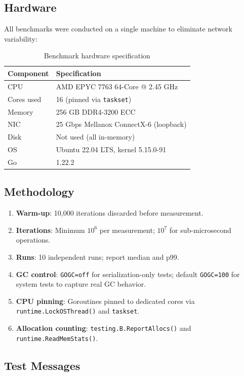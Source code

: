 \documentclass[11pt,letterpaper]{article}
\begin{document}
\subsection{Hardware}

All benchmarks were conducted on a single machine to eliminate network variability:

\begin{table}[h]
\centering
\caption{Benchmark hardware specification}
\begin{tabular}{ll}
\toprule
\textbf{Component} & \textbf{Specification} \\
\midrule
CPU & AMD EPYC 7763 64-Core @ 2.45 GHz \\
Cores used & 16 (pinned via \texttt{taskset}) \\
Memory & 256 GB DDR4-3200 ECC \\
NIC & 25 Gbps Mellanox ConnectX-6 (loopback) \\
Disk & Not used (all in-memory) \\
OS & Ubuntu 22.04 LTS, kernel 5.15.0-91 \\
Go & 1.22.2 \\
\bottomrule
\end{tabular}
\end{table}

\subsection{Methodology}

\begin{enumerate}
\item \textbf{Warm-up}: 10,000 iterations discarded before measurement.
\item \textbf{Iterations}: Minimum $10^6$ per measurement; $10^7$ for sub-microsecond operations.
\item \textbf{Runs}: 10 independent runs; report median and p99.
\item \textbf{GC control}: \texttt{GOGC=off} for serialization-only tests; default \texttt{GOGC=100} for system tests to capture real GC behavior.
\item \textbf{CPU pinning}: Goroutines pinned to dedicated cores via \texttt{runtime.LockOSThread()} and \texttt{taskset}.
\item \textbf{Allocation counting}: \texttt{testing.B.ReportAllocs()} and \texttt{runtime.ReadMemStats()}.
\end{enumerate}

\subsection{Test Messages}
\end{document}

